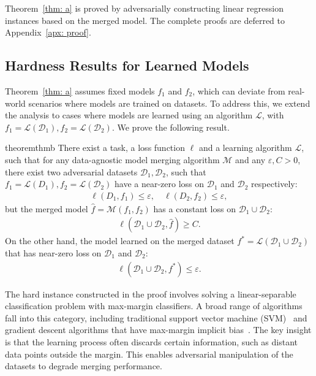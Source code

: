 \vspace{-5pt}
Theorem~\ref{thm: a} is proved by adversarially constructing linear regression instances based on the merged model. The complete proofs are deferred to Appendix~\ref{apx: proof}.

\subsection{Hardness Results for Learned Models}

Theorem~\ref{thm: a} assumes fixed models $f_1$ and $f_2$, which can deviate from real-world scenarios where models are trained on datasets. To address this, we extend the analysis to cases where models are learned using an algorithm $\mathcal{L}$, with $f_1 = \mathcal{L}(\mathcal{D}_1), f_2 = \mathcal{L}(\mathcal{D}_2)$. We prove the following result. 

\begin{restatable}{theorem}{thmb}
\label{thm: b}
There exist a task, a loss function $\ell$ and a learning algorithm $\mathcal{L}$, such that for any data-agnostic model merging algorithm $\mathcal{M}$ and any $\varepsilon, C>0$, there exist two adversarial datasets $\mathcal{D}_1, \mathcal{D}_2$, such that $f_1 = \mathcal{L}(D_1), f_2=\mathcal{L}(\mathcal{D}_2)$ have a near-zero loss  on $\mathcal{D}_1$ and $\mathcal{D}_2$ respectively:
    \vspace{0pt}
    \begin{align*}
        \ell(D_1, f_1)\le \varepsilon,\quad  \ell(D_2, f_2)\le \varepsilon, 
    \end{align*}
    but the merged model $\hat{f}=\mathcal{M}(f_1, f_2)$ has a constant loss on $\mathcal{D}_1\cup \mathcal{D}_2$:
    \vspace{0pt}
    \begin{align*}
        \ell(\mathcal{D}_1\cup \mathcal{D}_2, \hat{f})\ge C.
    \end{align*}
    On the other hand, the model learned on the merged dataset $f^* = \mathcal{L}(\mathcal{D}_1\cup \mathcal{D}_2)$ that has near-zero loss on $\mathcal{D}_1$ and $\mathcal{D}_2$:
    \vspace{0pt}
    \begin{align*}
        \ell(\mathcal{D}_1\cup \mathcal{D}_2, f^*)\le \varepsilon.
    \end{align*}
\end{restatable}

\vspace{-5pt}
The hard instance constructed in the proof involves solving a linear-separable classification problem with max-margin classifiers. 
A broad range of algorithms fall into this category, including traditional support vector machine (SVM)~\citep{cortes1995support} and gradient descent algorithms that have max-margin implicit bias~\citep{nacson2019convergence, lyu2019gradient}.
The key insight is that the learning process often discards certain information, such as distant data points outside the margin. This enables adversarial manipulation of the datasets to degrade merging performance.


